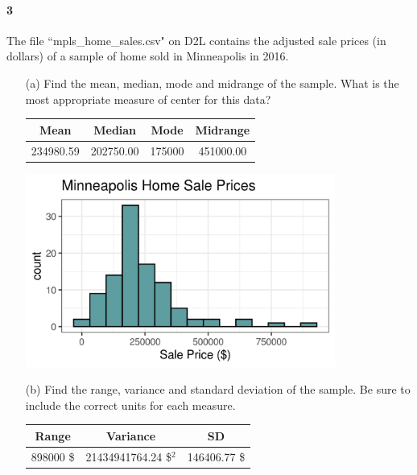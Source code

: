 \documentclass{article}
\begin{document}
\begin{flushleft}
\begin{itemize}
\vspace{.5in}
\end{itemize}


\newpage
\paragraph{3} The file ``mpls\_home\_sales.csv" on D2L contains the adjusted sale prices (in dollars) of a sample of home sold in Minneapolis in 2016. 
\begin{itemize}
\item [(a)] Find the mean, median, mode and midrange of the sample. What is the most appropriate measure of center for this data?\\

\bigskip
{\centering
\begin{tabular}{cccc}
Mean & Median & Mode & Midrange \\ 
  \hline
234980.59 & 202750.00 & 175000 & 451000.00 \\ 
\end{tabular}
\par}
\bigskip
{}

\bigskip
{\centering
\includegraphics[width=4in]{images/group04_Q2_a}
\par}

\vspace{.5in}


\item[(b)] Find the range, variance and standard deviation of the sample. Be sure to include the correct units for each measure.\\

\bigskip
{\centering
\begin{tabular}{ccc}
Range & Variance & SD \\ 
  \hline
898000 \$ & 21434941764.24 \$$^2$ & 146406.77 \$ \\ 
\end{tabular}
\par}
\vspace{.5in}


\end{itemize}
\end{flushleft}
\end{document}
